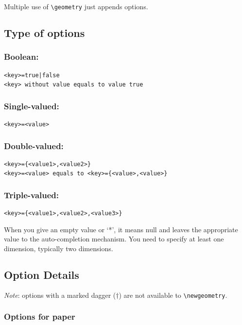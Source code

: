 \documentclass[a4paper,oneside]{book}
\begin{document}
Multiple use of \verb|\geometry| just appends options.

\subsection{Type of options}

\subsubsection{Boolean:}
\begin{verbatim}
<key>=true|false
<key> without value equals to value true
\end{verbatim}

\subsubsection{Single-valued:}
\begin{verbatim}
<key>=<value>
\end{verbatim}

\subsubsection{Double-valued:}
\begin{verbatim}
<key>={<value1>,<value2>}
<key>=<value> equals to <key>={<value>,<value>}
\end{verbatim}

\subsubsection{Triple-valued:}
\begin{verbatim}
<key>={<value1>,<value2>,<value3>}
\end{verbatim}

When you give an empty value or `*', it means null and leaves the appropriate value to the auto-completion mechanism. You need to specify at least one dimension, typically two dimensions.

\subsection{Option Details}
\emph{Note}: options with a marked dagger ($\dag$) are not available to \verb|\newgeometry|.

\subsubsection{Options for paper}
\end{document}
